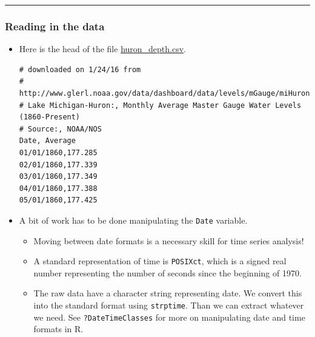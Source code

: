\documentclass[]{article}
\newenvironment{Shaded}{\begin{snugshade}}{\end{snugshade}}
\newcommand{\KeywordTok}[1]{\textcolor[rgb]{0.13,0.29,0.53}{\textbf{#1}}}
\newcommand{\DataTypeTok}[1]{\textcolor[rgb]{0.13,0.29,0.53}{#1}}
\newcommand{\StringTok}[1]{\textcolor[rgb]{0.31,0.60,0.02}{#1}}
\newcommand{\OtherTok}[1]{\textcolor[rgb]{0.56,0.35,0.01}{#1}}
\newcommand{\OperatorTok}[1]{\textcolor[rgb]{0.81,0.36,0.00}{\textbf{#1}}}
\newcommand{\NormalTok}[1]{#1}
\begin{document}
\begin{center}\rule{0.5\linewidth}{\linethickness}\end{center}

\subsubsection{Reading in the data}\label{reading-in-the-data}

\begin{itemize}
\item
  Here is the head of the file
  \href{./huron_depth.csv}{huron\_depth.csv}.

\begin{verbatim}
# downloaded on 1/24/16 from
# http://www.glerl.noaa.gov/data/dashboard/data/levels/mGauge/miHuronMog.csv
# Lake Michigan-Huron:, Monthly Average Master Gauge Water Levels (1860-Present)
# Source:, NOAA/NOS
Date, Average
01/01/1860,177.285
02/01/1860,177.339
03/01/1860,177.349
04/01/1860,177.388
05/01/1860,177.425
\end{verbatim}
\item
  A bit of work has to be done manipulating the \texttt{Date} variable.

  \begin{itemize}
  \item
    Moving between date formats is a necessary skill for time series
    analysis!
  \item
    A standard representation of time is \texttt{POSIXct}, which is a
    signed real number representing the number of seconds since the
    beginning of 1970.
  \item
    The raw data have a character string representing date. We convert
    this into the standard format using \texttt{strptime}. Than we can
    extract whatever we need. See \texttt{?DateTimeClasses} for more on
    manipulating date and time formats in R.
  \end{itemize}
\end{itemize}

\begin{Shaded}
\end{Shaded}
\end{document}
